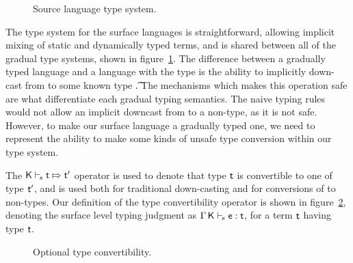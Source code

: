 \documentclass[runnningheads]{tex/llncs}
\begin{document}
\begin{figure}[!h]
\begin{mathpar}
          \end{mathpar}
  
  \vspace{2mm}
  
  \hrulefill
  \caption{Source language type system.}\label{fig:slts}
\end{figure}

The type system for the surface languages is straightforward, allowing
implicit mixing of static and dynamically typed terms, and is shared between
all of the gradual type systems, shown in figure~\ref{fig:slts}.  The
difference between a gradually typed language and a language with the \any
type is the ability to implicitly down-cast from \any to some known type
\t. The mechanisms which makes this operation safe are what differentiate
each gradual typing semantics.  The naive typing rules would not allow an
implicit downcast from \any to a non-\any type, as it is not safe. However,
to make our surface language a gradually typed one, we need to represent the
ability to make some kinds of unsafe type conversion within our type system.

The $\ConvertE\K{s}{\t}{\tp}$ operator is used to denote that type $\t$ is
convertible to one of type $\tp$, and is used both for traditional
down-casting and for conversions of \any to non-\any types. Our definition
of the type convertibility operator is shown in figure~\ref{fig:tyconvert},
denoting the surface level typing judgment as $\EnvTypeS\Env\K\e\t$, for a
term $\t$ having type $\t$.

\begin{figure}[!h]
  \hrulefill  \small  \vspace{-3mm}
  
  \begin{mathpar}
    
    
  \end{mathpar}
  \vspace{-8mm}
  
  \hrulefill
  \caption{Optional type convertibility.}\label{fig:tyconvert}
\end{figure}
\end{document}

